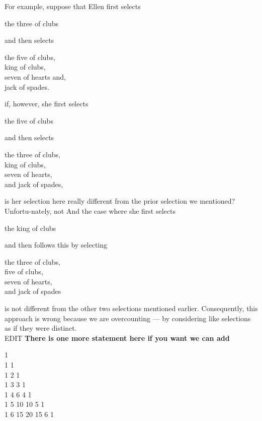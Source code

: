 \documentclass[11pt]{article}
\begin{document}
For example, suppose that Ellen first selects 
\begin{center}
the three of clubs
\end{center}
and then selects 
\begin{center}
the five of clubs,\\
king of clubs,\\
seven of hearts and,\\
 jack of spades. 
\end{center}
if, however, she first selects
\begin{center}
the five of clubs 
\end{center}
and then selects 
\begin{center}
the three of clubs, \\
king of clubs, \\
seven of hearts, \\
and jack of spades, \\
\end{center}
is her selection here really different from the prior selection we mentioned? Unfortu-nately, not And the case where she first selects 
\begin{center}
the king of clubs
\end{center}
and then follows this by selecting
\begin{center}
the three of clubs,\\
five of clubs,\\
seven of hearts, \\
and jack of spades \\
\end{center}
is not different from the other two selections mentioned earlier. Consequently, this approach is wrong because we are overcounting — by considering like selections as if they were distinct. 
\\

EDIT
\textbf{There is one more statement here if you want we can add}
\\

\begin{center}
1\\1 1\\1 2 1\\1 3 3 1\\1 4 6 4 1\\1 5 10 10 5 1\\1 6 15 20 15 6 1\\
\end{center}
\end{document}
